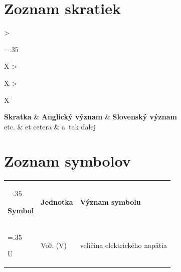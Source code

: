 \section*{Zoznam skratiek}

\begin{xltabular}{\textwidth}{
		>{\hsize=.35\hsize\raggedright\arraybackslash}X
		>{\raggedright\arraybackslash}X
		>{\raggedright\arraybackslash}X}
	\textbf{Skratka} & \textbf{Anglický význam} & \textbf{Slovenský význam} \\
	etc. & et cetera & a~tak ďalej
\end{xltabular}

\section*{Zoznam symbolov}

\begin{tabularx}{\textwidth}{
		>{\hsize=.35\hsize\raggedright\arraybackslash}X
		>{\raggedright\arraybackslash}X
		>{\raggedright\arraybackslash}X}
	\textbf{Symbol} & \textbf{Jednotka} & \textbf{Význam symbolu} \\
	U~& Volt (V) & veličina elektrického napätia
\end{tabularx}